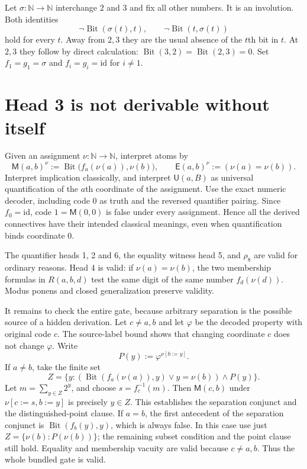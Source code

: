 \documentclass[10pt]{article}
\newcommand{\Bit}{\operatorname{Bit}}
\newcommand{\M}{\mathsf M}
\newcommand{\U}{\mathsf U}
\newcommand{\E}{\mathsf E}
\begin{document}
Let $\sigma:\mathbb N\to\mathbb N$ interchange $2$ and $3$ and fix
all other numbers.  It is an involution.  Both identities
\[
 \neg\Bit(\sigma(t),t),\qquad
 \neg\Bit(t,\sigma(t))
\]
hold for every $t$.  Away from $2,3$ they are the usual absence of the
$t$th bit in $t$.  At $2,3$ they follow by direct calculation:
$\Bit(3,2)=\Bit(2,3)=0$.
Set $f_1=g_1=\sigma$ and $f_i=g_i=\mathrm{id}$ for $i\ne1$.

\section{Head 3 is not derivable without itself}

Given an assignment $\nu:\mathbb N\to\mathbb N$, interpret atoms by
\[
 \M(a,b)^\nu:=\Bit\bigl(f_a(\nu(a)),\nu(b)\bigr),\qquad
 \E(a,b)^\nu:=(\nu(a)=\nu(b)).
\]
Interpret implication classically, and interpret $\U(a,B)$ as
universal quantification of the $a$th coordinate of the assignment.
Use the exact numeric decoder, including code $0$ as truth and the
reversed quantifier pairing.  Since $f_0=\mathrm{id}$, code
$1=\M(0,0)$ is false under every assignment.  Hence all the derived
connectives have their intended classical meanings, even when
quantification binds coordinate $0$.

The quantifier heads 1, 2 and 6, the equality witness head 5, and
$\rho_8$ are valid for ordinary reasons.  Head 4 is valid: if
$\nu(a)=\nu(b)$, the two membership formulas in $R(a,b,d)$ test
the same digit of the same number $f_d(\nu(d))$.  Modus ponens and
closed generalization preserve validity.

It remains to check the entire gate, because arbitrary separation
is the possible source of a hidden derivation.  Let $c\ne a,b$ and
let $\varphi$ be the decoded property with original code $c$.
The source-label bound shows that changing coordinate $c$ does not
change $\varphi$.  Write
\[
 P(y):=\varphi^{\nu[b:=y]}.
\]
If $a\ne b$, take the finite set
\[
 Z=\{y:(\Bit(f_a(\nu(a)),y)\vee y=\nu(b))\wedge P(y)\}.
\]
Let $m=\sum_{y\in Z}2^y$, and choose $s=f_c^{-1}(m)$.  Then
$\M(c,b)$ under $\nu[c:=s,b:=y]$ is precisely $y\in Z$.  This
establishes the separation conjunct and the distinguished-point
clause.  If $a=b$, the first antecedent of the separation conjunct
is $\Bit(f_b(y),y)$, which is always false.  In this case use just
$Z=\{\nu(b):P(\nu(b))\}$; the remaining subset condition and the
point clause still hold.  Equality and membership vacuity are valid
because $c\ne a,b$.  Thus the whole bundled gate is valid.
\end{document}
